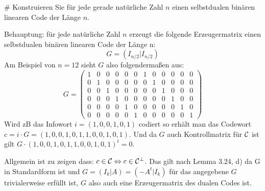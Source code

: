 \begin{myList}
#
Konstruieren Sie für jede gerade natürliche Zahl $n$ einen selbstdualen binären linearen Code der Länge $n$.\medskip

Behauptung: für jede natürliche Zahl $n$ erzeugt die folgende Erzeugermatrix einen selbstdualen binären linearen Code der Länge n:
\begin{equation*}
	G = (I_{n/2} | I_{n/2})
\end{equation*}
Am Beispiel von $n = 12$ sieht $G$ also folgendermaßen aus:
\begin{equation*}
	G = 
	\begin{pmatrix}
	1 & 0 & 0 & 0 & 0 & 0 		& 1 & 0 & 0 & 0 & 0 & 0\\
	0 & 1 & 0 & 0 & 0 & 0 		& 0 & 1 & 0 & 0 & 0 & 0\\
	0 & 0 & 1 & 0 & 0 & 0 		& 0 & 0 & 1 & 0 & 0 & 0\\
	0 & 0 & 0 & 1 & 0 & 0 		& 0 & 0 & 0 & 1 & 0 & 0\\
	0 & 0 & 0 & 0 & 1 & 0 		& 0 & 0 & 0 & 0 & 1 & 0\\
	0 & 0 & 0 & 0 & 0 & 1 		& 0 & 0 & 0 & 0 & 0 & 1
	\end{pmatrix}
\end{equation*}
Wird zB das Infowort $i =(1,0,0,1,0,1)$ codiert so erhält man das Codewort $c = i \cdot G = (1,0,0,1,0,1,1,0,0,1,0,1)$. Und da $G$ auch Kontrollmatrix für $\mathcal{C}$ ist gilt $G \cdot (1,0,0,1,0,1,1,0,0,1,0,1)^t = 0$.\medskip

Allgemein ist zu zeigen dass: $c \in \mathcal{C} \Leftrightarrow c \in \mathcal{C}^\bot$.
Das gilt nach Lemma 3.24, d) da G in Standardform ist und $G = (I_k|A) = (-A^t|I_k)$ für das angegebene $G$ trivialerweise erfüllt ist, $G$ also auch eine Erzeugermatrix des dualen Codes ist.
\end{myList}
